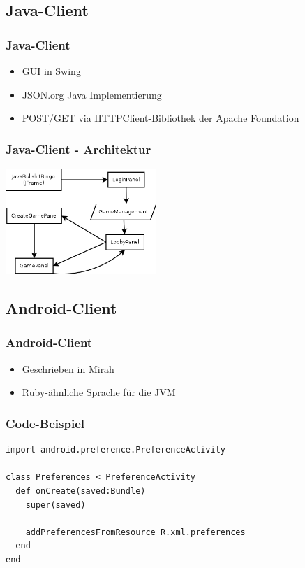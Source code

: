 \documentclass{beamer}
\begin{document}
\subsection{Java-Client}
\begin{frame}[fragile]
\frametitle{Java-Client}
\begin{itemize}
\item GUI in Swing
\item JSON.org Java Implementierung
\item POST/GET via HTTPClient-Bibliothek der Apache Foundation
\end{itemize}
\end{frame}

\begin{frame}[fragile]
\frametitle{Java-Client - Architektur}
\begin{center}
\includegraphics[height=4cm]{JBB_Aufbau.png}
\end{center}
\end{frame}

\subsection{Android-Client}

\begin{frame}[fragile]
\frametitle{Android-Client}
\begin{itemize}
\item Geschrieben in Mirah
\item Ruby-ähnliche Sprache für die JVM
\end{itemize}
\end{frame}


\begin{frame}[fragile]
\frametitle{Code-Beispiel}
\begin{lstlisting}
import android.preference.PreferenceActivity

class Preferences < PreferenceActivity
  def onCreate(saved:Bundle)
    super(saved)

    addPreferencesFromResource R.xml.preferences
  end
end
\end{lstlisting}
\end{frame}
\end{document}
